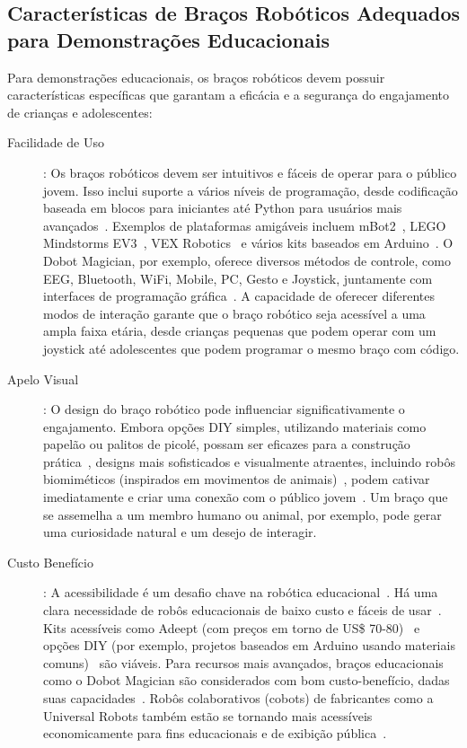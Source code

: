 \documentclass[%
  a4paper,%
  12pt,%
  fleqn,%
  english,%
  brazilian,%
]{article}
\begin{document}
\subsection{Características de Braços Robóticos Adequados para Demonstrações Educacionais}
Para demonstrações educacionais, os braços robóticos devem possuir características específicas que garantam a eficácia e a segurança do engajamento de crianças e adolescentes:
	\begin{description}
		\item [Facilidade de Uso]: Os braços robóticos devem ser intuitivos e fáceis de operar para o público jovem. Isso inclui suporte a vários níveis de programação, desde codificação baseada em blocos para iniciantes até Python para usuários mais avançados~\cite{makeblockMBot22025}. Exemplos de plataformas amigáveis incluem mBot2~\cite{makeblockMBot22025}, LEGO Mindstorms EV3~\cite{centrePointRoboticsGames2025}, VEX Robotics~\cite{meegleYouthRobotics2025} e vários kits baseados em Arduino~\cite{cheung2024SummerLibraries}. O Dobot Magician, por exemplo, oferece diversos métodos de controle, como EEG, Bluetooth, WiFi, Mobile, PC, Gesto e Joystick, juntamente com interfaces de programação gráfica~\cite{robotlabDobotClassroomPack2025}. A capacidade de oferecer diferentes modos de interação garante que o braço robótico seja acessível a uma ampla faixa etária, desde crianças pequenas que podem operar com um joystick até adolescentes que podem programar o mesmo braço com código.
		\item [Apelo Visual]: O design do braço robótico pode influenciar significativamente o engajamento. Embora opções DIY simples, utilizando materiais como papelão ou palitos de picolé, possam ser eficazes para a construção prática~\cite{scienceBuddiesBuildRoboticArm2025}, designs mais sofisticados e visualmente atraentes, incluindo robôs biomiméticos (inspirados em movimentos de animais)~\cite{ross2024BeyondExhibits}, podem cativar imediatamente e criar uma conexão com o público jovem~\cite{chang2025ConstructedResponse}. Um braço que se assemelha a um membro humano ou animal, por exemplo, pode gerar uma curiosidade natural e um desejo de interagir.
		\item [Custo Benefício]: A acessibilidade é um desafio chave na robótica educacional~\cite{ross2024BeyondExhibits}. Há uma clara necessidade de robôs educacionais de baixo custo e fáceis de usar~\cite{ross2024BeyondExhibits}. Kits acessíveis como Adeept (com preços em torno de US\$ 70-80)~\cite{robotshopArmsGrippers2025} e opções DIY (por exemplo, projetos baseados em Arduino usando materiais comuns)~\cite{scienceBuddiesBuildRoboticArm2025} são viáveis. Para recursos mais avançados, braços educacionais como o Dobot Magician são considerados com bom custo-benefício, dadas suas capacidades~\cite{robotlabDobotClassroomPack2025}. Robôs colaborativos (cobots) de fabricantes como a Universal Robots também estão se tornando mais acessíveis economicamente para fins educacionais e de exibição pública~\cite{top3dshopDobotMagicianReview2023}.

\end{description}
\end{document}

